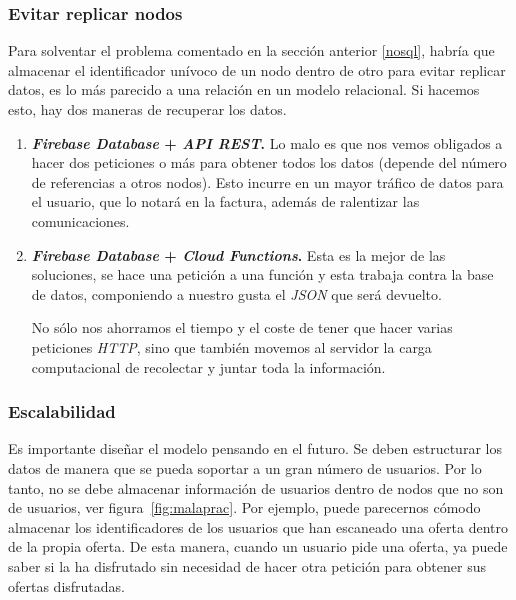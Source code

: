\subsubsection*{Evitar replicar nodos}
Para solventar el problema comentado en la sección anterior \ref{nosql}, habría que almacenar el identificador unívoco de un nodo dentro de otro para evitar replicar datos, es lo más parecido a una relación en un modelo relacional. Si hacemos esto, hay dos maneras de recuperar los datos.

\begin{enumerate}
\item\textbf{\textit{Firebase Database} + \textit{API REST}.} Lo malo es que nos vemos obligados a hacer dos peticiones o más para obtener todos los datos (depende del número de referencias a otros nodos). Esto incurre en un mayor tráfico de datos para el usuario, que lo notará en la factura, además de ralentizar las comunicaciones.

\item\textbf{\textit{Firebase Database} + \textit{Cloud Functions}.} Esta es la mejor de las soluciones, se hace una petición a una función y esta trabaja contra la base de datos, componiendo a nuestro gusta el \textit{JSON} que será devuelto.

No sólo nos ahorramos el tiempo y el coste de tener que hacer varias peticiones \textit{HTTP}, sino que también movemos al servidor la carga computacional de recolectar y juntar toda la información.
\end{enumerate}

\subsubsection*{Escalabilidad}
Es importante diseñar el modelo pensando en el futuro. Se deben estructurar los datos de manera que se pueda soportar a un gran número de usuarios. Por lo tanto, no se debe almacenar información de usuarios dentro de nodos que no son de usuarios, ver figura~\ref{fig:malaprac}. Por ejemplo, puede parecernos cómodo almacenar los identificadores de los usuarios que han escaneado una oferta dentro de la propia oferta. De esta manera, cuando un usuario pide una oferta, ya puede saber si la ha disfrutado sin necesidad de hacer otra petición para obtener sus ofertas disfrutadas.

